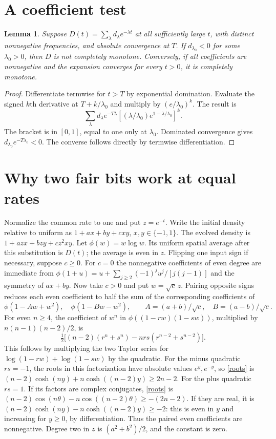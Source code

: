\documentclass[11pt]{article}
\newtheorem{lemma}{Lemma}
\begin{document}
\section{A coefficient test}
\begin{lemma}\label{spec}
Suppose $D(t)=\sum_{\lambda}d_\lambda e^{-\lambda t}$ at all sufficiently
large $t$, with distinct nonnegative frequencies, and absolute convergence
at $T$. If $d_{\lambda_0}<0$ for some $\lambda_0>0$, then $D$ is not
completely monotone. Conversely, if all coefficients are nonnegative and
the expansion converges for every $t>0$, it is completely monotone.
\end{lemma}
\begin{proof}
Differentiate termwise for $t>T$ by exponential domination. Evaluate the
signed $k$th derivative at $T+k/\lambda_0$ and multiply by
$(e/\lambda_0)^k$. The result is
\[
 \sum_\lambda d_\lambda e^{-T\lambda}
 \left[(\lambda/\lambda_0)e^{1-\lambda/\lambda_0}\right]^k.
\]
The bracket is in $[0,1]$, equal to one only at $\lambda_0$.
Dominated convergence gives $d_{\lambda_0}e^{-T\lambda_0}<0$.
The converse follows directly by termwise differentiation.
\end{proof}

\section{Why two fair bits work at equal rates}
Normalize the common rate to one and put $z=e^{-t}$. Write the initial
density relative to uniform as $1+ax+by+cxy$, $x,y\in\{-1,1\}$.
The evolved density is $1+azx+bzy+cz^2xy$. Let $\phi(w)=w\log w$.
Its uniform spatial average after this substitution is $D(t)$; the average
is even in $z$. Flipping one input sign if necessary, suppose $c\ge0$.
For $c=0$ the nonnegative coefficients of even degree are immediate
from $\phi(1+u)=u+\sum_{j\ge2}(-1)^ju^j/[j(j-1)]$ and the symmetry
of $ax+by$. Now take $c>0$ and put $w=\sqrt c\,z$. Pairing opposite signs
reduces each even coefficient to half the sum of the corresponding
coefficients of
\[
 \phi(1-Aw+w^2),\quad \phi(1-Bw-w^2),
 \qquad A=(a+b)/\sqrt c,\quad B=(a-b)/\sqrt c.
\]
For even $n\ge4$, the coefficient of $w^n$ in
$\phi((1-rw)(1-sw))$, multiplied by $n(n-1)(n-2)/2$, is
\begin{equation}\label{roots}
 \tfrac12\big[(n-2)(r^n+s^n)-nrs(r^{n-2}+s^{n-2})\big].
\end{equation}
This follows by multiplying the two Taylor series for
$\log(1-rw)+\log(1-sw)$ by the quadratic.
For the minus quadratic $rs=-1$, the roots in this factorization have
absolute values $e^y,e^{-y}$, so \eqref{roots} is
$(n-2)\cosh(ny)+n\cosh((n-2)y)\ge2n-2$.
For the plus quadratic $rs=1$. If its factors are complex conjugates,
\eqref{roots} is $(n-2)\cos(n\theta)-n\cos((n-2)\theta)\ge-(2n-2)$.
If they are real, it is $(n-2)\cosh(ny)-n\cosh((n-2)y)\ge-2$:
this is even in $y$ and increasing for $y\ge0$, by differentiation.
Thus the paired even coefficients are nonnegative. Degree two in $z$ is
$(a^2+b^2)/2$, and the constant is zero.
\end{document}
